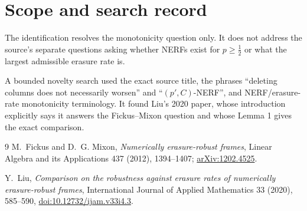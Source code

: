 \documentclass[11pt]{article}
\begin{document}
\section{\hspace{0.35em}Scope and search record}

The identification resolves the monotonicity question only. It does not
address the source's separate questions asking whether NERFs exist for
$p\geq\tfrac12$ or what the largest admissible erasure rate is.

A bounded novelty search used the exact source title, the phrases
``deleting columns does not necessarily worsen'' and
``$(p',C)$-NERF'', and NERF/erasure-rate monotonicity terminology. It found
Liu's 2020 paper, whose introduction explicitly says it answers the
Fickus--Mixon question and whose Lemma 1 gives the exact comparison.

\begin{thebibliography}{9}
M.~Fickus and D.~G. Mixon,
\emph{Numerically erasure-robust frames},
Linear Algebra and its Applications 437 (2012), 1394--1407;
\href{https://arxiv.org/abs/1202.4525}{arXiv:1202.4525}.

Y.~Liu,
\emph{Comparison on the robustness against erasure rates of numerically
erasure-robust frames},
International Journal of Applied Mathematics 33 (2020), 585--590,
\href{https://doi.org/10.12732/ijam.v33i4.3}{doi:10.12732/ijam.v33i4.3}.
\end{thebibliography}
\end{document}
